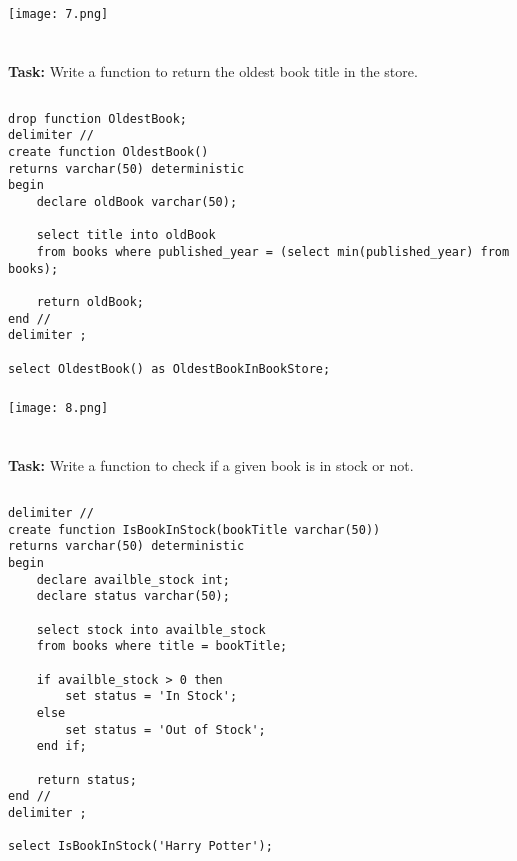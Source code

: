 \documentclass[12pt,a4paper]{article}
\begin{document}
\subsubsection{}
\begin{center}
    \texttt{[image: 7.png]}
\end{center}


\section{}
\textbf{Task:} Write a function to return the oldest book title in the store.

\subsection{}
\begin{lstlisting}
drop function OldestBook;
delimiter //
create function OldestBook()
returns varchar(50) deterministic
begin
	declare oldBook varchar(50);
    
    select title into oldBook 
    from books where published_year = (select min(published_year) from books);
    
    return oldBook;
end //
delimiter ;

select OldestBook() as OldestBookInBookStore;
\end{lstlisting}

\subsubsection{}
\begin{center}
    \texttt{[image: 8.png]}
\end{center}


\section{}
\textbf{Task:} Write a function to check if a given book is in stock or not.

\subsection{}
\begin{lstlisting}
delimiter //
create function IsBookInStock(bookTitle varchar(50))
returns varchar(50) deterministic
begin
	declare availble_stock int;
	declare status varchar(50);
    
    select stock into availble_stock 
    from books where title = bookTitle;
    
    if availble_stock > 0 then
		set status = 'In Stock';
	else
		set status = 'Out of Stock';
	end if;
    
    return status;
end //
delimiter ;

select IsBookInStock('Harry Potter');
\end{lstlisting}
\end{document}

